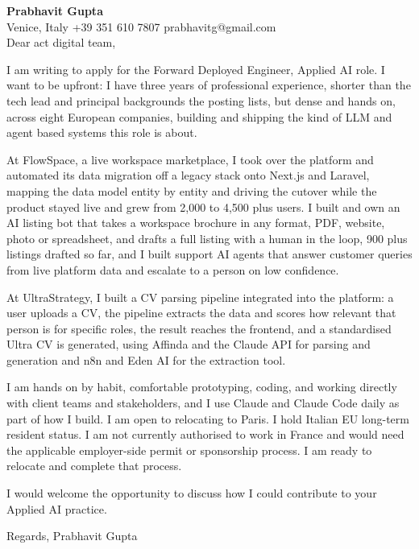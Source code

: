 \documentclass[a4paper,10.5pt]{article}
\begin{document}
\textbf{Prabhavit Gupta}\\
Venice, Italy \textbar{} +39 351 610 7807 \textbar{} prabhavitg@gmail.com\\[10pt]
Dear act digital team,

I am writing to apply for the Forward Deployed Engineer, Applied AI role. I want to be upfront: I have three years of professional experience, shorter than the tech lead and principal backgrounds the posting lists, but dense and hands on, across eight European companies, building and shipping the kind of LLM and agent based systems this role is about.

At FlowSpace, a live workspace marketplace, I took over the platform and automated its data migration off a legacy stack onto Next.js and Laravel, mapping the data model entity by entity and driving the cutover while the product stayed live and grew from 2,000 to 4,500 plus users. I built and own an AI listing bot that takes a workspace brochure in any format, PDF, website, photo or spreadsheet, and drafts a full listing with a human in the loop, 900 plus listings drafted so far, and I built support AI agents that answer customer queries from live platform data and escalate to a person on low confidence.

At UltraStrategy, I built a CV parsing pipeline integrated into the platform: a user uploads a CV, the pipeline extracts the data and scores how relevant that person is for specific roles, the result reaches the frontend, and a standardised Ultra CV is generated, using Affinda and the Claude API for parsing and generation and n8n and Eden AI for the extraction tool.

I am hands on by habit, comfortable prototyping, coding, and working directly with client teams and stakeholders, and I use Claude and Claude Code daily as part of how I build. I am open to relocating to Paris. I hold Italian EU long-term resident status. I am not currently authorised to work in France and would need the applicable employer-side permit or sponsorship process. I am ready to relocate and complete that process.

I would welcome the opportunity to discuss how I could contribute to your Applied AI practice.

Regards,
Prabhavit Gupta
\end{document}
